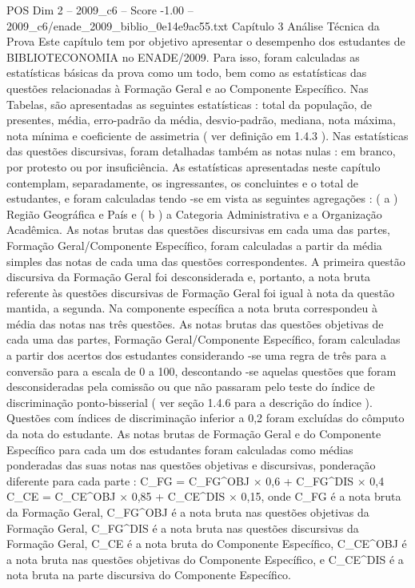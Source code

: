 \begin{textsample}{POS Dim 2 – 2009\_c6 – Score -1.00 – 2009\_c6/enade\_2009\_biblio\_0e14e9ac55.txt}  \label{ex:f2_pos_303}
Capítulo 3 Análise Técnica da Prova Este capítulo tem por objetivo apresentar o desempenho dos estudantes de BIBLIOTECONOMIA no ENADE/2009.
Para isso, foram calculadas as estatísticas básicas da prova como um todo, bem como as estatísticas das questões relacionadas à Formação Geral e ao Componente Específico.
Nas Tabelas, são apresentadas as seguintes estatísticas : total da população, de presentes, média, erro-padrão da média, desvio-padrão, mediana, nota máxima, nota mínima e coeficiente de assimetria ( ver definição em 1.4.3 ).
Nas estatísticas das questões discursivas, foram detalhadas também as notas nulas : em branco, por protesto ou por insuficiência.
As estatísticas apresentadas neste capítulo contemplam, separadamente, os ingressantes, os concluintes e o total de estudantes, e foram calculadas tendo -se em vista as seguintes agregações : ( a ) Região Geográfica e País e ( b ) a Categoria Administrativa e a Organização Acadêmica.
As notas brutas das questões discursivas em cada uma das partes, Formação Geral/Componente Específico, foram calculadas a partir da média simples das notas de cada uma das questões correspondentes.
A primeira questão discursiva da Formação Geral foi desconsiderada e, portanto, a nota bruta referente às questões discursivas de Formação Geral foi igual à nota da questão mantida, a segunda.
Na componente específica a nota bruta correspondeu à média das notas nas três questões.
As notas brutas das questões objetivas de cada uma das partes, Formação Geral/Componente Específico, foram calculadas a partir dos acertos dos estudantes considerando -se uma regra de três para a conversão para a escala de 0 a 100, descontando -se aquelas questões que foram desconsideradas pela comissão ou que não passaram pelo teste do índice de discriminação ponto-bisserial ( ver seção 1.4.6 para a descrição do índice ).
Questões com índices de discriminação inferior a 0,2 foram excluídas do cômputo da nota do estudante.
As notas brutas de Formação Geral e do Componente Específico para cada um dos estudantes foram calculadas como médias ponderadas das suas notas nas questões objetivas e discursivas, ponderação diferente para cada parte : C\_FG = C\_FG\textasciicircum{}OBJ × 0,6 + C\_FG\textasciicircum{}DIS × 0,4 C\_CE = C\_CE\textasciicircum{}OBJ × 0,85 + C\_CE\textasciicircum{}DIS × 0,15, onde C\_FG é a nota bruta da Formação Geral, C\_FG\textasciicircum{}OBJ é a nota bruta nas questões objetivas da Formação Geral, C\_FG\textasciicircum{}DIS é a nota bruta nas questões discursivas da Formação Geral, C\_CE é a nota bruta do Componente Específico, C\_CE\textasciicircum{}OBJ é a nota bruta nas questões objetivas do Componente Específico, e C\_CE\textasciicircum{}DIS é a nota bruta na parte discursiva do Componente Específico.

\end{textsample}
